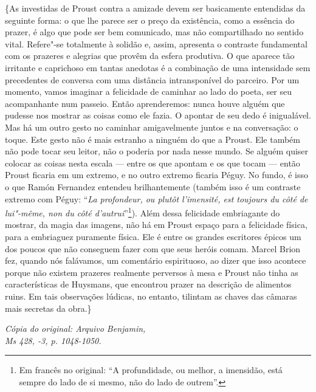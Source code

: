 \{As investidas de Proust contra a amizade devem ser basicamente entendidas
da seguinte forma: o que lhe parece ser o preço da existência, como a
essência do prazer, é algo que pode ser bem comunicado, mas não
compartilhado no sentido vital. Refere"-se totalmente à solidão e, assim,
apresenta o contraste fundamental com os prazeres e alegrias que provêm
da esfera produtiva. O que aparece tão irritante e caprichoso em tantas
anedotas é a combinação de uma intensidade sem precedentes de conversa
com uma distância intransponível do parceiro. Por um momento, vamos
imaginar a felicidade de caminhar ao lado do poeta, ser seu acompanhante
num passeio. Então aprenderemos: nunca houve alguém que pudesse nos
mostrar as coisas como ele fazia. O apontar de seu dedo é inigualável. Mas
há um outro gesto no caminhar amigavelmente juntos e na conversação: o toque. Este
gesto não é mais estranho a ninguém do que a Proust. Ele também não pode
tocar seu leitor, não o poderia por nada nesse mundo. Se alguém quiser
colocar as coisas nesta escala --- entre os que apontam e os que
tocam --- então Proust ficaria em um extremo, e no outro extremo ficaria
Péguy. No fundo, é isso o que Ramón Fernandez entendeu brilhantemente
(também isso é um contraste extremo com Péguy: ``\emph{La profondeur, ou
plutôt l'imensité, est toujours du côté de lui"-même, non du côté
d'autrui}''\footnote{Em francês no original: ``A profundidade, ou melhor, a imensidão,
  está sempre do lado de si mesmo, não do lado de outrem''. \versal{[N. T.]}}). Além
dessa felicidade embriagante do mostrar, da magia das imagens, não há em
Proust espaço para a felicidade física, para a embriaguez puramente
física. Ele é entre os grandes escritores épicos um dos poucos que não
conseguem fazer com que seus heróis comam. Marcel Brion fez, quando nós
falávamos, um comentário espirituoso, ao dizer que isso acontece porque não
existem prazeres realmente perversos à mesa e Proust não tinha as
características de Huysmans, que encontrou prazer na descrição de
alimentos ruins. Em tais observações lúdicas, no entanto, tilintam as
chaves das câmaras mais secretas da obra.\}

\begin{flushright}
\emph{\footnotesize{Cópia do original: Arquivo Benjamin,\\ Ms 428, -3, p. 1048-1050.}}
\end{flushright}

